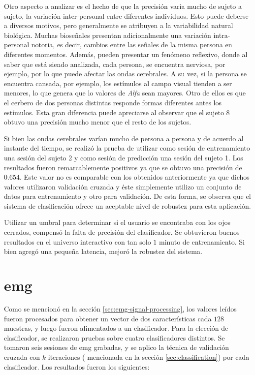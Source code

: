 Otro aspecto a analizar es el hecho de que la precisión varía mucho de sujeto a sujeto, la variación inter-personal entre diferentes individuos. Esto puede deberse a diversos motivos, pero generalmente se atribuyen a la variabilidad natural biológica. Muchas bioseñales presentan adicionalmente una variación intra-personal notoria, es decir, cambios entre las señales de la misma persona en diferentes momentos.  Además, pueden presentar un fenómeno reflexivo, donde al saber que está siendo analizada, cada persona, se encuentra nerviosa, por ejemplo, por lo que puede afectar las ondas cerebrales. A su vez, si la persona se encuentra cansada, por ejemplo, los estímulos al campo visual tienden a ser menores, lo que genera que lo valores de \emph{Alfa} sean mayores. Otro de ellos es que el cerbero de dos personas distintas responde formas diferentes antes los estímulos. Esta gran diferencia puede apreciarse al observar que el sujeto $8$ obtuvo una precisión mucho menor que el resto de los sujetos.

Si bien las ondas cerebrales varían mucho de persona a persona y de acuerdo al instante del tiempo, se realizó la prueba de utilizar como sesión de entrenamiento una sesión del sujeto 2  y como sesión de predicción una sesión del sujeto 1. Los resultados fueron remarcablemente positivos ya que se obtuvo una precisión de $0.654$. Este valor no es comparable con los obtenidos anteriormente ya que dichos valores utilizaron validación cruzada y éste simplemente utilizo un conjunto de datos para entrenamiento y otro para validación. De esta forma, se observa que el sistema de clasificación ofrece un aceptable nivel de robustez para esta aplicación.

Utilizar un umbral para determinar si el usuario se encontraba con los ojos cerrados, compensó la falta de precisión del clasificador. Se obtuvieron buenos resultados en el universo interactivo con tan solo $1$ minuto de entrenamiento. Si bien agregó una pequeña latencia, mejoró la robustez del sistema.

\section{\acrshort{emg}} \label{sec:emg-results}

Como se mencionó en la sección \ref{sec:emg-signal-processing}, los valores leídos fueron procesados para obtener un vector de dos características cada $128$ muestras, y luego fueron alimentados a un clasificador. Para la elección de clasificador, se realizaron pruebas sobre cuatro clasificadores distintos. Se tomaron seis sesiones de \acrshort{emg} grabadas, y se aplico la técnica de validación cruzada con $k$ iteraciones ( mencionada en la sección \ref{sec:classification}) por cada clasificador. Los resultados fueron los siguientes:

